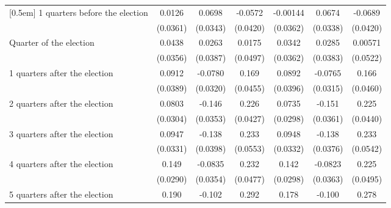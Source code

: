 \begin{table}[!ht]
\begin{tabular}{l*{6}{c}}
[0.5em]
 1 quarters before the election&      0.0126         &      0.0698\sym{*}  &     -0.0572         &    -0.00144         &      0.0674\sym{*}  &     -0.0689         \\
                    &    (0.0361)         &    (0.0343)         &    (0.0420)         &    (0.0362)         &    (0.0338)         &    (0.0420)         \\
[0.5em]
Quarter of the election&      0.0438         &      0.0263         &      0.0175         &      0.0342         &      0.0285         &     0.00571         \\
                    &    (0.0356)         &    (0.0387)         &    (0.0497)         &    (0.0362)         &    (0.0383)         &    (0.0522)         \\
[0.5em]
 1 quarters after the election&      0.0912\sym{*}  &     -0.0780\sym{*}  &       0.169\sym{***}&      0.0892\sym{*}  &     -0.0765\sym{*}  &       0.166\sym{***}\\
                    &    (0.0389)         &    (0.0320)         &    (0.0455)         &    (0.0396)         &    (0.0315)         &    (0.0460)         \\
[0.5em]
 2 quarters after the election&      0.0803\sym{**} &      -0.146\sym{***}&       0.226\sym{***}&      0.0735\sym{*}  &      -0.151\sym{***}&       0.225\sym{***}\\
                    &    (0.0304)         &    (0.0353)         &    (0.0427)         &    (0.0298)         &    (0.0361)         &    (0.0440)         \\
[0.5em]
 3 quarters after the election&      0.0947\sym{**} &      -0.138\sym{***}&       0.233\sym{***}&      0.0948\sym{**} &      -0.138\sym{***}&       0.233\sym{***}\\
                    &    (0.0331)         &    (0.0398)         &    (0.0553)         &    (0.0332)         &    (0.0376)         &    (0.0542)         \\
[0.5em]
 4 quarters after the election&       0.149\sym{***}&     -0.0835\sym{*}  &       0.232\sym{***}&       0.142\sym{***}&     -0.0823\sym{*}  &       0.225\sym{***}\\
                    &    (0.0290)         &    (0.0354)         &    (0.0477)         &    (0.0298)         &    (0.0363)         &    (0.0495)         \\
[0.5em]
 5 quarters after the election&       0.190\sym{***}&      -0.102\sym{**} &       0.292\sym{***}&       0.178\sym{***}&      -0.100\sym{**} &       0.278\sym{***}\\

\end{tabular}
\end{table}
